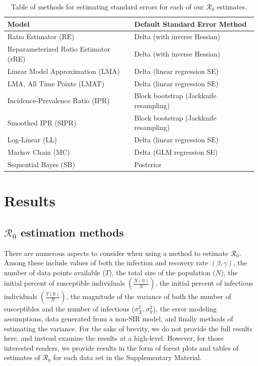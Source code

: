 \documentclass[12pt]{article}
\newcommand{\rr}{\ensuremath{\mathcal{R}_0}}
\begin{document}
\begin{table}[H]
	\centering
	\begin{tabular}{@{}ll@{}}
		\toprule
		\textbf{Model} & \textbf{Default Standard Error Method} \\ \midrule
		Ratio Estimator (RE) & Delta (with inverse Hessian)\\
		Reparameterized Ratio Estimator (rRE) & Delta (with inverse Hessian) \\
		Linear Model Approximation (LMA) & Delta (linear regression SE) \\
		LMA, All Time Points  (LMAT)& Delta (linear regression SE)\\
		Incidence-Prevalence Ratio (IPR) & Block bootstrap (Jackknife resampling) \\
		Smoothed IPR (SIPR) & Block bootstrap (Jackknife resampling) \\
		Log-Linear (LL) & Delta (linear regression SE) \\
		Markov Chain (MC) & Delta (GLM regression SE) \\
		Sequential Bayes (SB) & Posterior\\
		\bottomrule
	\end{tabular}
	\caption{Table of methods for estimating standard errors for each of our $\rr$ estimates.}
	\label{tab:se-methods}
\end{table}



\section{Results}\label{sec:results-top}
\subsection{$\rr$ estimation methods}\label{sec:results}
There are numerous aspects to consider when using a method to estimate $\rr$.  Among these include values of both the infection and recovery rate $(\beta, \gamma)$, the number of data points available ($T$), the total size of the population ($N$), the initial percent of susceptible individuals $\left (\frac{X(0)}{N}\right)$, the initial percent of infectious individuals $\left (\frac{Y(0)}{N}\right )$, the magnitude of the variance of both the number of susceptibles and the number of infectious ($\sigma_X^2, \sigma_Y^2$), the error modeling assumptions, data generated from a non-SIR model, and finally methods of estimating the variance.  For the sake of brevity, we do not provide the full results here, and instead examine the results at a high-level.  However, for those interested readers, we provide results in the form of forest plots and tables of estimates of $\rr$ for each data set in the Supplementary Material.
\end{document}
